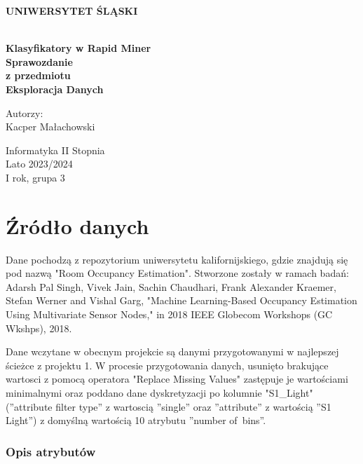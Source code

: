 \documentclass[12pt,oneside,a4paper]{book} %
\theoremstyle{break}
\begin{document}
\thispagestyle{empty}
\begin{center}
  \Large
  \bf{UNIWERSYTET ŚLĄSKI}\\
  \bf{}\\[25mm]
  \large

  \bf{Klasyfikatory w Rapid Miner}\\[35mm]

  Sprawozdanie\\
  z przedmiotu\\
  Eksploracja Danych\\[25mm]
\end{center}
\begin{flushright}
  \large
  Autorzy:\\
  Kacper Małachowski\\
\end{flushright}
\vspace*{\fill}
\begin{center}
  Informatyka II Stopnia\\
  Lato 2023/2024\\
  I rok, grupa 3\\[25mm]
\end{center}

\chapter*{Źródło danych}

Dane pochodzą z repozytorium uniwersytetu kalifornijskiego, gdzie znajdują się pod nazwą "Room Occupancy Estimation".
Stworzone zostały w ramach badań: Adarsh Pal Singh, Vivek Jain, Sachin Chaudhari, Frank Alexander Kraemer, Stefan Werner and Vishal Garg, "Machine Learning-Based Occupancy Estimation Using Multivariate Sensor Nodes," in 2018 IEEE Globecom Workshops (GC Wkshps), 2018.

Dane wczytane w obecnym projekcie są danymi przygotowanymi w najlepszej ścieżce z projektu 1. W procesie przygotowania danych, usunięto brakujące wartosci z pomocą operatora "Replace Missing Values" zastępuje je wartościami minimalnymi oraz poddano dane dyskretyzacji po kolumnie "S1\_Light" (”attribute filter type” z wartoscią ”single” oraz ”attribute” z wartością ”S1 Light”) z domyślną wartością 10 atrybutu ”number of~bins”.

\subsection*{Opis atrybutów}
\end{document}
